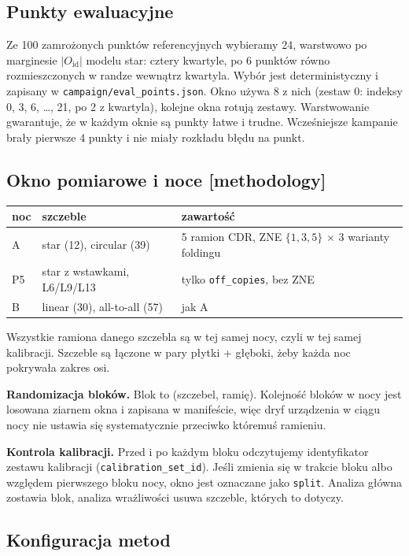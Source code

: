 \documentclass[11pt,a4paper]{article}
\newcommand{\slid}[1]{\hfill{\normalfont\small\ttfamily\color{axbluedk}[#1]}}
\newcommand{\Oid}{O_{\mathrm{id}}}
\begin{document}
\subsection{Punkty ewaluacyjne}

Ze 100 zamrożonych punktów referencyjnych wybieramy 24, warstwowo po marginesie $|\Oid|$ modelu
star: cztery kwartyle, po 6 punktów równo rozmieszczonych w randze wewnątrz kwartyla. Wybór jest
deterministyczny i zapisany w \texttt{campaign/eval\_points.json}. Okno używa 8 z nich (zestaw 0:
indeksy 0, 3, 6, \dots, 21, po 2 z kwartyla), kolejne okna rotują zestawy. Warstwowanie
gwarantuje, że w każdym oknie są punkty łatwe i trudne. Wcześniejsze kampanie brały pierwsze 4
punkty i nie miały rozkładu błędu na punkt.

\subsection{Okno pomiarowe i noce \slid{methodology}}

\begin{center}
\begin{tabular}{@{}lll@{}}
\toprule
noc & szczeble & zawartość \\
\midrule
A & star (12), circular (39) & 5 ramion CDR, ZNE $\{1,3,5\}$ $\times$ 3 warianty foldingu \\
P5 & star z wstawkami, L6/L9/L13 & tylko \texttt{off\_copies}, bez ZNE \\
B & linear (30), all-to-all (57) & jak A \\
\bottomrule
\end{tabular}
\end{center}
Wszystkie ramiona danego szczebla są w tej samej nocy, czyli w tej samej kalibracji. Szczeble są
łączone w pary płytki + głęboki, żeby każda noc pokrywała zakres osi.

\textbf{Randomizacja bloków.} Blok to (szczebel, ramię). Kolejność bloków w nocy jest losowana
ziarnem okna i zapisana w manifeście, więc dryf urządzenia w ciągu nocy nie ustawia się
systematycznie przeciwko któremuś ramieniu.

\textbf{Kontrola kalibracji.} Przed i po każdym bloku odczytujemy identyfikator zestawu kalibracji
(\texttt{calibration\_set\_id}). Jeśli zmienia się w trakcie bloku albo względem pierwszego bloku
nocy, okno jest oznaczane jako \texttt{split}. Analiza główna zostawia blok, analiza wrażliwości
usuwa szczeble, których to dotyczy.

\subsection{Konfiguracja metod}
\end{document}

